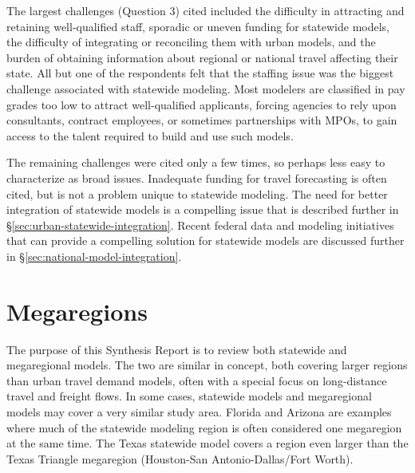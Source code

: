 The largest challenges (Question 3) cited included the difficulty in attracting and retaining well-qualified staff, sporadic or uneven funding for statewide models, the difficulty of integrating or reconciling them with urban models, and the burden of obtaining information about regional or national travel affecting their state. All but one of the respondents felt that the staffing issue was the biggest challenge associated with statewide modeling. Most modelers are classified in pay grades too low to attract well-qualified applicants, forcing agencies to rely upon consultants, contract employees, or sometimes partnerships with MPOs, to gain access to the talent required to build and use such models.

The remaining challenges were cited only a few times, so perhaps less easy to characterize as broad issues. Inadequate funding for travel forecasting is often cited, but is not a problem unique to statewide modeling. The need for better integration of statewide models is a compelling issue that is described further in \S\ref{sec:urban-statewide-integration}. Recent federal data and modeling initiatives that can provide a compelling solution for statewide models are discussed further in \S\ref{sec:national-model-integration}.

\section{Megaregions}

The purpose of this Synthesis Report is to review both statewide and megaregional models. The two are similar in concept, both covering larger regions than urban travel demand models, often with a special focus on long-distance travel and freight flows. In some cases, statewide models and megaregional models may cover a very similar study area. Florida and Arizona are examples where much of the statewide modeling region is often considered one megaregion at the same time. The Texas statewide model covers a region even larger than the Texas Triangle megaregion (Houston-San Antonio-Dallas/Fort Worth).

